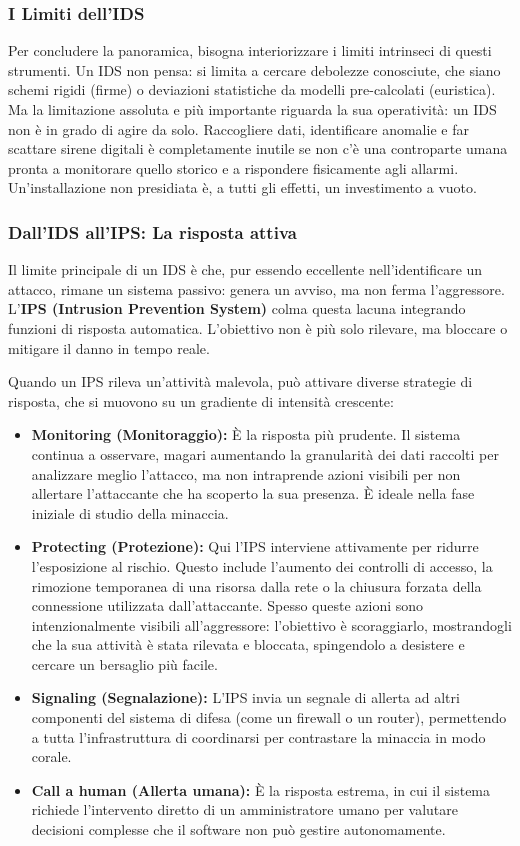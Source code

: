 \documentclass{article}
\begin{document}
\subsubsection*{I Limiti dell'IDS}

Per concludere la panoramica, bisogna interiorizzare i limiti intrinseci di questi strumenti. Un IDS non pensa: si limita a cercare debolezze conosciute, che siano schemi rigidi (firme) o deviazioni statistiche da modelli pre-calcolati (euristica). Ma la limitazione assoluta e più importante riguarda la sua operatività: un IDS non è in grado di agire da solo. Raccogliere dati, identificare anomalie e far scattare sirene digitali è completamente inutile se non c'è una controparte umana pronta a monitorare quello storico e a rispondere fisicamente agli allarmi. Un'installazione non presidiata è, a tutti gli effetti, un investimento a vuoto.

\subsubsection*{Dall'IDS all'IPS: La risposta attiva}

Il limite principale di un IDS è che, pur essendo eccellente nell'identificare un attacco, rimane un sistema passivo: genera un avviso, ma non ferma l'aggressore. L'\textbf{IPS (Intrusion Prevention System)} colma questa lacuna integrando funzioni di risposta automatica. L'obiettivo non è più solo rilevare, ma bloccare o mitigare il danno in tempo reale.

Quando un IPS rileva un'attività malevola, può attivare diverse strategie di risposta, che si muovono su un gradiente di intensità crescente:

\begin{itemize}
    \item \textbf{Monitoring (Monitoraggio):} È la risposta più prudente. Il sistema continua a osservare, magari aumentando la granularità dei dati raccolti per analizzare meglio l'attacco, ma non intraprende azioni visibili per non allertare l'attaccante che ha scoperto la sua presenza. È ideale nella fase iniziale di studio della minaccia.
    \item \textbf{Protecting (Protezione):} Qui l'IPS interviene attivamente per ridurre l'esposizione al rischio. Questo include l'aumento dei controlli di accesso, la rimozione temporanea di una risorsa dalla rete o la chiusura forzata della connessione utilizzata dall'attaccante. Spesso queste azioni sono intenzionalmente visibili all'aggressore: l'obiettivo è scoraggiarlo, mostrandogli che la sua attività è stata rilevata e bloccata, spingendolo a desistere e cercare un bersaglio più facile.
    \item \textbf{Signaling (Segnalazione):} L'IPS invia un segnale di allerta ad altri componenti del sistema di difesa (come un firewall o un router), permettendo a tutta l'infrastruttura di coordinarsi per contrastare la minaccia in modo corale.
    \item \textbf{Call a human (Allerta umana):} È la risposta estrema, in cui il sistema richiede l'intervento diretto di un amministratore umano per valutare decisioni complesse che il software non può gestire autonomamente.
\end{itemize}
\end{document}
